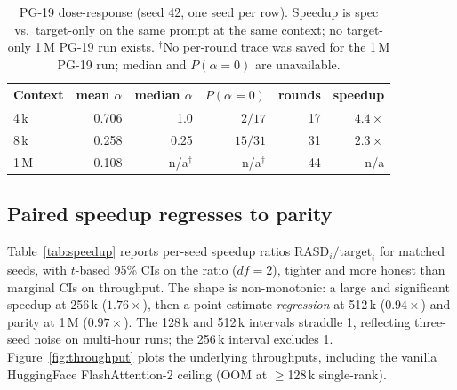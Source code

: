 \documentclass{article}
\begin{document}
\begin{table}[t]
\centering
\footnotesize
\caption{PG-19 dose-response (seed 42, one seed per row). Speedup
is spec vs.\ target-only on the same prompt at the same context;
no target-only 1\,M PG-19 run exists. $^{\dagger}$No per-round
trace was saved for the 1\,M PG-19 run; median and
$P(\alpha{=}0)$ are unavailable.}
\label{tab:pg19}
\begin{tabular}{lrrrrr}
\toprule
Context & mean $\alpha$ & median $\alpha$ & $P(\alpha{=}0)$ & rounds & speedup \\
\midrule
4\,k & 0.706 & 1.0   & $2/17$ & 17 & $4.4\times$ \\
8\,k & 0.258 & 0.25  & $15/31$ & 31 & $2.3\times$ \\
1\,M & 0.108 & n/a$^{\dagger}$ & n/a$^{\dagger}$ & 44 & n/a \\
\bottomrule
\end{tabular}
\end{table}

\subsection{Paired speedup regresses to parity}
\label{sec:speedup}

Table~\ref{tab:speedup} reports per-seed speedup ratios
$\mathrm{RASD}_i / \mathrm{target}_i$ for matched seeds, with
$t$-based 95\% CIs on the ratio ($df=2$), tighter and more
honest than marginal CIs on throughput. The shape is
non-monotonic: a large and significant speedup at 256\,k
($1.76\times$), then a point-estimate \emph{regression} at 512\,k
($0.94\times$) and parity at 1\,M ($0.97\times$). The 128\,k and
512\,k intervals straddle 1, reflecting three-seed noise on
multi-hour runs; the 256\,k interval excludes 1. Figure~\ref{fig:throughput}
plots the underlying throughputs, including the vanilla
HuggingFace FlashAttention-2 ceiling (OOM at $\geq$128\,k
single-rank).
\end{document}
